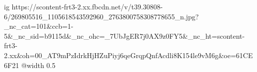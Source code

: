  
 
 
 
 

\ifcmt
  ig https://scontent-frt3-2.xx.fbcdn.net/v/t39.30808-6/269805516_1105618543592960_2763800758308778655_n.jpg?_nc_cat=101&ccb=1-5&_nc_sid=b9115d&_nc_ohc=_7UbJgER7j0AX9z0FY5&_nc_ht=scontent-frt3-2.xx&oh=00_AT9mPzIdrkHjHZuPiyj6qeGrqpQnfAcdli8K154le9vM6g&oe=61CE6F21
  @width 0.5
\fi
